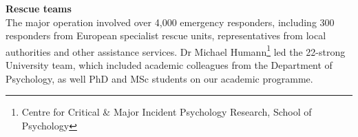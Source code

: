\documentclass[11pt]{article}%
\begin{document}
\begin{minipage}{.75\linewidth}
\begin{multicols}{2}
\textbf{Rescue teams}\\
The major operation involved over 4,000 emergency responders, including 300 responders from European specialist rescue units, representatives from local authorities and other assistance services. 
Dr Michael Humann\footnote{Centre for Critical \& Major Incident Psychology Research, School of Psychology} led the 22-strong University team, which included academic colleagues from the Department of Psychology, as well PhD and MSc students on our academic programme.




\end{multicols}






\end{minipage}
\hspace{0.01\textwidth}
\end{document}
